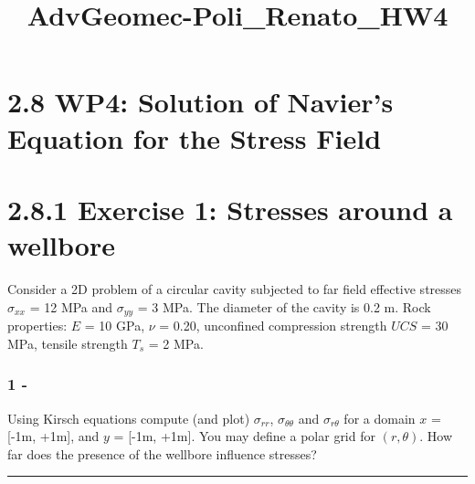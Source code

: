 \documentclass[8pt]{extarticle}
\title{AdvGeomec-Poli\_Renato\_HW4}
\begin{document}
    
    \maketitle
    
    

    
    \hypertarget{wp4-solution-of-naviers-equation-for-the-stress-field}{%
\section*{2.8 WP4: Solution of Navier's Equation for the Stress
Field}\label{wp4-solution-of-naviers-equation-for-the-stress-field}}

\hypertarget{exercise-1-stresses-around-a-wellbore}{%
\section*{2.8.1 Exercise 1: Stresses around a
wellbore}\label{exercise-1-stresses-around-a-wellbore}}

Consider a 2D problem of a circular cavity subjected to far field
effective stresses \(\sigma_{xx}\) = 12 MPa and \(\sigma_{yy}\) = 3 MPa.
The diameter of the cavity is 0.2 m. Rock properties: \(E\) = 10 GPa,
\(\nu\) = 0.20, unconfined compression strength \(UCS\) = 30 MPa,
tensile strength \(T_s\) = 2 MPa.

\hypertarget{section*}{%
\subsubsection*{1 -}\label{section}}

Using Kirsch equations compute (and plot) \(\sigma_{rr}\),
\(\sigma_{\theta\theta}\) and \(\sigma_{r\theta}\) for a domain \(x\) =
{[}-1m, +1m{]}, and \(y\) = {[}-1m, +1m{]}. You may define a polar grid
for \((r,\theta)\). How far does the presence of the wellbore influence
stresses?

\begin{center}\rule{0.5\linewidth}{0.5pt}\end{center}
\end{document}
